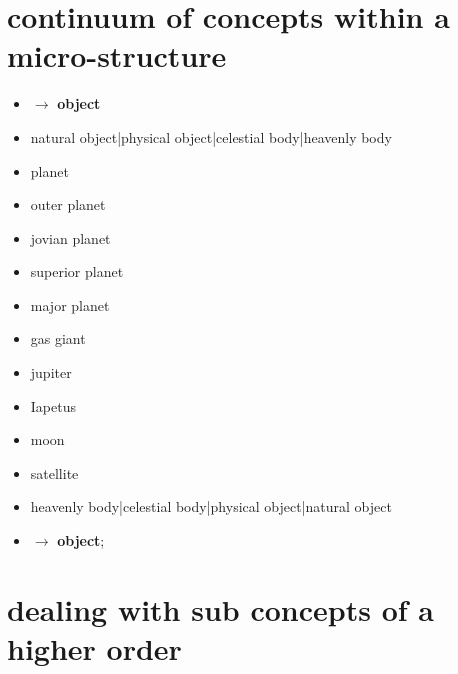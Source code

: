 \documentclass[15pt]{article}
\begin{document}
\vskip 0.4cm

\section{continuum of concepts within a micro-structure}  
  
\begin{itemize}
\item $\rightarrow$ \textbf{object}
\item natural object|physical object|celestial body|heavenly body
\item planet
\item outer planet
\item jovian planet
\item superior planet
\item major planet
\item gas giant
\item jupiter
\item Iapetus
\item moon
\item satellite
\item heavenly body|celestial body|physical object|natural object 
\item $\rightarrow$ \textbf{object};
\end{itemize}   


\section{dealing with sub concepts of a higher order}
\end{document}
